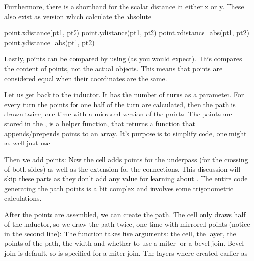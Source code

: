 Furthermore, there is a shorthand for the scalar distance in either x or y.
These also exist as version which calculate the absolute:
\begin{lualisting}
    point.xdistance(pt1, pt2)
    point.ydistance(pt1, pt2)
    point.xdistance_abs(pt1, pt2)
    point.ydistance_abs(pt1, pt2)
\end{lualisting}

Lastly, points can be compared by using \luainline{==} (as you would expect).
This compares the content of points, not the actual objects.
This means that points are considered equal when their coordinates are the same.

\bigskip

Let us get back to the inductor.
It has the number of turns as a parameter.
For every turn the points for one half of the turn are calculated, then the path is drawn twice, one time with a mirrored version of the points.
The points are stored in the ,  is a helper function, that returns a function that appends/prepends points to an array. It's purpose is to simplify code, one
might as well just use .

Then we add points:
Now the cell adds points for the underpass (for the crossing of both sides) as well as the extension for the connections.
This discussion will skip these parts as they don't add any value for learning about .
The entire code generating the path points is a bit complex and involves some trigonometric calculations.

After the points are assembled, we can create the path. The cell only draws half of the inductor, so we draw the path twice, one time with mirrored points (notice
 in the second line):
The  function takes five arguments: the cell, the layer, the points of the path, the width and whether to use a miter- or a bevel-join. Bevel-join is
default, so  is specified for a miter-join.
The layers where created earlier as

